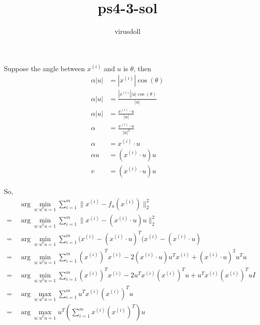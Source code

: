 \documentclass[11pt, a4paper]{article}
\title{ps4-3-sol}
\author{virusdoll}
\begin{document}
    \maketitle

    Suppose the angle between $x^{(i)}$ and $u$ is $\theta$, then
    \begin{align*}
        \alpha | u | & = | x^{(i)} | \cos(\theta) \\
        \alpha | u | & = \frac{|x^{(i)}| |u| \cos(\theta)}{|u|} \\
        \alpha | u | & = \frac{x^{(i)} \cdot u}{|u|} \\
        \alpha & = \frac{x^{(i)} \cdot u}{|u|^2} \\
        \alpha & = x^{(i)} \cdot u \\
        \alpha u & = (x^{(i)} \cdot u) u \\
        v & = (x^{(i)} \cdot u) u
    \end{align*}

    So,
    \begin{align*}
        & \ \arg \min_{u:u^Tu=1} \sum^m_{i=1} \| x^{(i)} - f_u(x^{(i)}) \|^2_2 \\
        = & \ \arg \min_{u:u^Tu=1} \sum^m_{i=1} \| x^{(i)} - (x^{(i)} \cdot u) u \|^2_2 \\
        = & \ \arg \min_{u:u^Tu=1} \sum^m_{i=1}
            (x^{(i)} - (x^{(i)} \cdot u)^T (x^{(i)} - (x^{(i)} \cdot u) \\
        = & \ \arg \min_{u:u^Tu=1} \sum^m_{i=1}
            (x^{(i)})^T x^{(i)} - 2 (x^{(i)} \cdot u) u^T x^{(i)} + (x^{(i)} \cdot u)^2 u^Tu \\
        = & \ \arg \min_{u:u^Tu=1} \sum^m_{i=1}
            (x^{(i)})^T x^{(i)} - 2 u^T x^{(i)} (x^{(i)})^T u + u^T x^{(i)} (x^{(i)})^T u I \\
        = & \ \arg \max_{u:u^Tu=1} \sum^m_{i=1} u^T x^{(i)} (x^{(i)})^T u \\
        = & \ \arg \max_{u:u^Tu=1} u^T ( \sum^m_{i=1} x^{(i)} (x^{(i)})^T ) u
    \end{align*}
\end{document}
